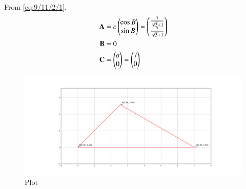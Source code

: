 \documentclass[journal]{IEEEtran}
\begin{document}
 From \eqref{eq:9/11/2/1},
 \begin{align}
 \mathbf{A}&=c\begin{pmatrix}\cos B\\ \sin B\end{pmatrix}=\begin{pmatrix}\frac{7}{\sqrt{3}+1} \\ \frac{7}{\sqrt{3}+1}\end{pmatrix}\\
\mathbf{B}&=0\\
\mathbf{C}&=\begin{pmatrix}a \\ 0\end{pmatrix}=\begin{pmatrix}7\\0\end{pmatrix}
 \end{align}
\begin{figure}[h!]
   \centering
   \includegraphics[width=1.1\columnwidth]{Figs/Figure_1.png}
   \caption{Plot}
   \label{3-3.3-8-Figure}
\end{figure}
\end{document}
